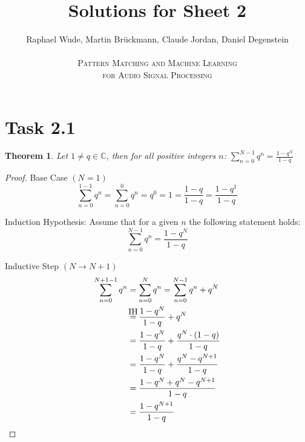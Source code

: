 \documentclass[12pt]{article}
\newcommand{\C}{\mathbb{C}}
\newtheorem{thm}{Theorem}
\newcommand\myeq{\stackrel{\mathclap{\normalfont\mbox{IH}}}{=}}
\begin{document}
\title{Solutions for Sheet 2}
\author{Raphael Wude, Martin Brückmann, Claude Jordan, Daniel Degenstein\\ \\
\textsc{Pattern Matching and Machine Learning} \\
\textsc{for Audio Signal Processing}}
\maketitle

\section*{Task 2.1}
\begin{thm} Let $1 \neq q \in \C$, then for all positive integers $n$: $\sum^{N-1}_{n=0}q^n = \frac{1-q^N}{1-q}$\end{thm}
\begin{proof}
Base Case $\left(N=1\right)$
$$\sum^{1-1}_{n=0}q^n 
= \sum^{0}_{n=0}q^n 
= q^0 
= 1 
= \frac{1-q}{1-q} 
= \frac{1-q^1}{1-q}$$

Induction Hypothesis: Assume that for a given  $n$ the following statement holds:
$$\sum^{N-1}_{n=0}q^n = \frac{1-q^N}{1-q}$$

Inductive Step $\left(N \longrightarrow N+1\right)$
\begin{align*} 
\sum^{N+1-1}_{n=0}q^n &= \sum^{N}_{n=0}q^n = \sum^{N-1}_{n=0}q^n + q^N \\
&\myeq \frac{1-q^N}{1-q} + q^N \\
&= \frac{1-q^N}{1-q} + \frac{q^N\cdot (1-q)}{1-q} \\
&= \frac{1-q^N}{1-q} + \frac{q^N-q^{N+1}}{1-q} \\
&= \frac{1-q^N+q^N-q^{N+1}}{1-q}\\
&= \frac{1-q^{N+1}}{1-q}
\end{align*}
\end{proof}

 
\end{document}
